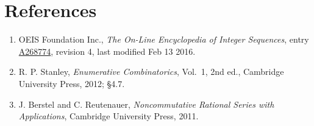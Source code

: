 \documentclass[11pt]{article}
\theoremstyle{definition}
\begin{document}
\section{References}

\begin{enumerate}

\item OEIS Foundation Inc., \emph{The On-Line Encyclopedia of Integer Sequences}, entry \href{https://oeis.org/A268774}{A268774}, revision 4, last modified Feb 13 2016.

\item R. P. Stanley, \emph{Enumerative Combinatorics}, Vol.~1, 2nd ed., Cambridge University Press, 2012; \S4.7.

\item J. Berstel and C. Reutenauer, \emph{Noncommutative Rational Series with Applications}, Cambridge University Press, 2011.

\end{enumerate}
\end{document}
